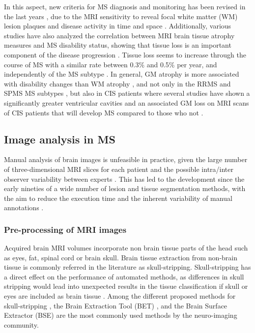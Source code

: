 \begin{figure*}[top]
  \begin{center}
    \vspace{-3cm}
  \end{center}
    \caption{}
    \label{mri_modalities}
\end{figure*}

In this aspect, new criteria for MS diagnosis and monitoring has been revised in the last years \cite{Polman2011}, due to the MRI sensitivity to reveal focal white matter (WM) lesion plaques and disease activity in time and space \cite{Filippi2011}. Additionally, various studies have also analyzed the correlation between MRI brain tissue atrophy measures and MS disability status, showing that tissue loss is an important component of the disease progression \cite{Chard2002, Filippi2013, Fisher2008, Rudick2009}. Tissue loss seems to increase through the course of MS with a similar rate between 0.3\% and 0.5\% per year, and independently of the MS subtype \cite{DeStefano2010, Rudick2009}. In general, GM atrophy is more associated with disability changes than WM atrophy \cite{Fisniku2008}, and not only in the RRMS and SPMS MS subtypes \cite{Fisher2008, Rudick2009}, but also in CIS patients where several studies have shown a significantly greater ventricular cavities and an associated GM loss on MRI scans of CIS patients that will develop MS compared to those who not \cite{Ceccarelli2010,Filippi2013}.

\subsection{Image analysis in MS}
\label{subsec:image_analysis}

Manual analysis of brain images is unfeasible in practice, given the large number of three-dimensional MRI slices for each patient and the possible intra/inter observer variability between experts \cite{Cabezas2011}. This has led to the development since the early nineties of a wide number of lesion and tissue segmentation methods, with the aim to reduce the execution time and the inherent variability of manual annotations \cite{Cline1990, Gerig1992, Kapur1996}. 


\subsubsection{Pre-processing of MRI images}
Acquired brain MRI volumes incorporate non brain tissue parts of the head such as eyes, fat, spinal cord or brain skull. Brain tissue extraction from non-brain tissue is commonly referred in the literature as skull-stripping. Skull-stripping has a direct effect on the performance of automated methods, as differences in skull stripping would lead into unexpected results in the tissue classification if skull or eyes are included as brain tissue \cite{Acosta-Cabronero2008, Popescu2012}. Among the different proposed methods for skull-stripping \cite{Acosta-Cabronero2008, Lee2003, Roura2014}, the Brain Extraction Tool (BET) \cite{Smith2002}, and the Brain Surface Extractor (BSE) \cite{Shattuck2001} are the most commonly used methods by the neuro-imaging community.

